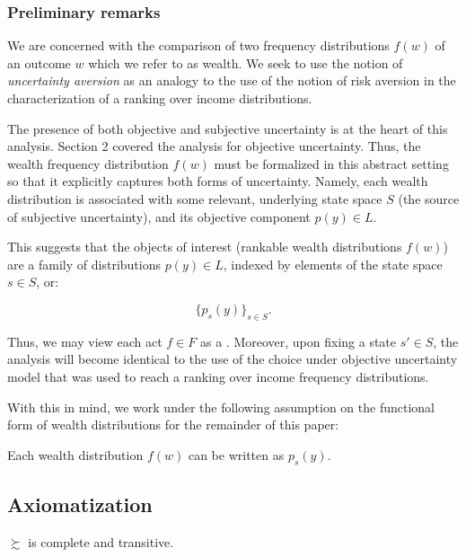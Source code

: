 \documentclass[Chp3.tex]{subfiles}
\begin{document}
\subsubsection*{Preliminary remarks}

We are concerned with the comparison of two frequency distributions $f(w)$ of an outcome $w$ which we refer to as wealth. We seek to use the notion of \textit{uncertainty aversion} as an analogy to the use of the notion of risk aversion in the characterization of a ranking over income distributions.

The presence of both objective and subjective uncertainty is at the heart of this analysis. Section 2 covered the analysis for objective uncertainty. Thus, the wealth frequency distribution $f(w)$ must be formalized in this abstract setting so that it explicitly captures both forms of uncertainty. Namely, each wealth distribution is associated with some relevant, underlying state space $S$ (the source of subjective uncertainty), and its objective component $p(y) \in L$. 

\par This suggests that the objects of interest (rankable wealth distributions $f(w)$) are a family of distributions $p(y) \in L$, indexed by elements of the state space $s \in S$, or:

$$\{ p_s(y) \}_{s \in S}.$$

\par Thus, we may view each act $f \in F$ as a . Moreover, upon fixing a state $s' \in S$, the analysis will become identical to the use of the choice under objective uncertainty model that was used to reach a ranking over income frequency distributions.

With this in mind, we work under the following assumption on the functional form of wealth distributions for the remainder of this paper:

\begin{assu}
Each wealth distribution $f(w)$ can be written as $p_s(y)$.
\end{assu}


\subsection{Axiomatization}

\begin{ax.AA}
$\succsim$ is complete and transitive.
\end{ax.AA}
\end{document}
